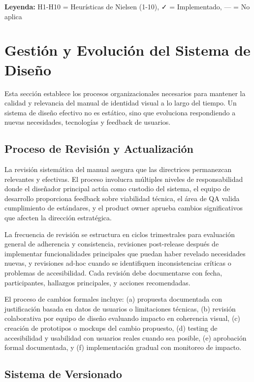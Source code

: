 \documentclass[12pt,a4paper,oneside]{article}
\begin{document}
\textbf{Leyenda:} H1-H10 = Heurísticas de Nielsen (1-10), ✓ = Implementado, — = No aplica


\section{Gestión y Evolución del Sistema de Diseño}

Esta sección establece los procesos organizacionales necesarios para mantener la calidad y relevancia del manual de identidad visual a lo largo del tiempo. Un sistema de diseño efectivo no es estático, sino que evoluciona respondiendo a nuevas necesidades, tecnologías y feedback de usuarios.

\subsection{Proceso de Revisión y Actualización}

La revisión sistemática del manual asegura que las directrices permanezcan relevantes y efectivas. El proceso involucra múltiples niveles de responsabilidad donde el diseñador principal actúa como custodio del sistema, el equipo de desarrollo proporciona feedback sobre viabilidad técnica, el área de QA valida cumplimiento de estándares, y el product owner aprueba cambios significativos que afecten la dirección estratégica.

La frecuencia de revisión se estructura en ciclos trimestrales para evaluación general de adherencia y consistencia, revisiones post-release después de implementar funcionalidades principales que puedan haber revelado necesidades nuevas, y revisiones ad-hoc cuando se identifiquen inconsistencias críticas o problemas de accesibilidad. Cada revisión debe documentarse con fecha, participantes, hallazgos principales, y acciones recomendadas.

El proceso de cambios formales incluye: (a) propuesta documentada con justificación basada en datos de usuarios o limitaciones técnicas, (b) revisión colaborativa por equipo de diseño evaluando impacto en coherencia visual, (c) creación de prototipos o mockups del cambio propuesto, (d) testing de accesibilidad y usabilidad con usuarios reales cuando sea posible, (e) aprobación formal documentada, y (f) implementación gradual con monitoreo de impacto.

\subsection{Sistema de Versionado}
\end{document}
